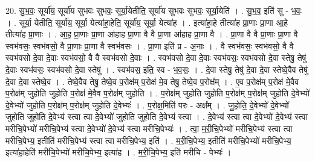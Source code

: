 \documentclass[17pt]{extarticle}
\begin{document}
20. सु॒भ॒वः॒ सूर्या॑य॒ सूर्या॑य सुभवः सुभवः॒ सूर्या॒येतीति॒ सूर्या॑य सुभवः सुभवः॒ सूर्या॒येति॑ । . सु॒भ॒व॒ इति॑ सु - भ॒वः॒ । . सूर्या॒ येतीति॒ सूर्या॑य॒ सूर्या॒ येत्या॑हा॒हेति॒ सूर्या॑य॒ सूर्या॒ येत्या॑ह । . इत्या॑हा॒हे तीत्या॑ह प्रा॒णाः प्रा॒णा आ॒हे तीत्या॑ह प्रा॒णाः । . आ॒ह॒ प्रा॒णाः प्रा॒णा आ॑हाह प्रा॒णा वै वै प्रा॒णा आ॑हाह प्रा॒णा वै । . प्रा॒णा वै वै प्रा॒णाः प्रा॒णा वै स्वभ॑वसः॒ स्वभ॑वसो॒ वै प्रा॒णाः प्रा॒णा वै स्वभ॑वसः । . प्रा॒णा इति॑ प्र - अ॒नाः । . वै स्वभ॑वसः॒ स्वभ॑वसो॒ वै वै स्वभ॑वसो दे॒वा दे॒वाः स्वभ॑वसो॒ वै वै स्वभ॑वसो दे॒वाः । . स्वभ॑वसो दे॒वा दे॒वाः स्वभ॑वसः॒ स्वभ॑वसो दे॒वा स्तेषु॒ तेषु॑ दे॒वाः स्वभ॑वसः॒ स्वभ॑वसो दे॒वा स्तेषु॑ । . स्वभ॑वस॒ इति॒ स्व - भ॒व॒सः॒ । . दे॒वा स्तेषु॒ तेषु॑ दे॒वा दे॒वा स्तेष्वे॒वैव तेषु॑ दे॒वा दे॒वा स्तेष्वे॒व । . तेष्वे॒वैव तेषु॒ तेष्वे॒व प॒रोक्ष॑म् प॒रोक्ष॑ मे॒व तेषु॒ तेष्वे॒व प॒रोक्ष᳚म् । . ए॒व प॒रोक्ष॑म् प॒रोक्ष॑ मे॒वैव प॒रोक्ष॑म् जुहोति जुहोति प॒रोक्ष॑ मे॒वैव प॒रोक्ष॑म् जुहोति । . प॒रोक्ष॑म् जुहोति जुहोति प॒रोक्ष॑म् प॒रोक्ष॑म् जुहोति दे॒वेभ्यो॑ दे॒वेभ्यो॑ जुहोति प॒रोक्ष॑म् प॒रोक्ष॑म् जुहोति दे॒वेभ्यः॑ । . प॒रोक्ष॒मिति॑ परः - अक्ष᳚म् । . जु॒हो॒ति॒ दे॒वेभ्यो॑ दे॒वेभ्यो॑ जुहोति जुहोति दे॒वेभ्य॑ स्त्वा त्वा दे॒वेभ्यो॑ जुहोति जुहोति दे॒वेभ्य॑ स्त्वा । . दे॒वेभ्य॑ स्त्वा त्वा दे॒वेभ्यो॑ दे॒वेभ्य॑ स्त्वा मरीचि॒पेभ्यो॑ मरीचि॒पेभ्य॑ स्त्वा दे॒वेभ्यो॑ दे॒वेभ्य॑ स्त्वा मरीचि॒पेभ्यः॑ । . त्वा॒ म॒री॒चि॒पेभ्यो॑ मरीचि॒पेभ्य॑ स्त्वा त्वा मरीचि॒पेभ्य॒ इतीति॑ मरीचि॒पेभ्य॑ स्त्वा त्वा मरीचि॒पेभ्य॒ इति॑ । . म॒री॒चि॒पेभ्य॒ इतीति॑ मरीचि॒पेभ्यो॑ मरीचि॒पेभ्य॒ इत्या॑हा॒हेति॑ मरीचि॒पेभ्यो॑ मरीचि॒पेभ्य॒ इत्या॑ह । . म॒री॒चि॒पेभ्य॒ इति॑ मरीचि - पेभ्यः॑ । \newline
\end{document}
